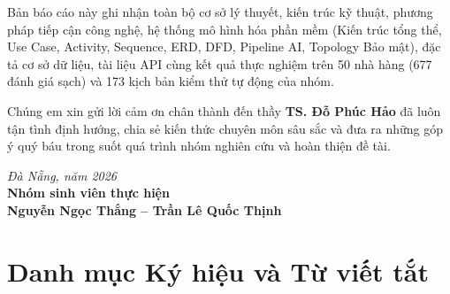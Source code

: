 \documentclass[12pt, a4paper]{article}
\begin{document}
Bản báo cáo này ghi nhận toàn bộ cơ sở lý thuyết, kiến trúc kỹ thuật, phương pháp tiếp cận công nghệ, hệ thống mô hình hóa phần mềm (Kiến trúc tổng thể, Use Case, Activity, Sequence, ERD, DFD, Pipeline AI, Topology Bảo mật), đặc tả cơ sở dữ liệu, tài liệu API cùng kết quả thực nghiệm trên 50 nhà hàng (677 đánh giá sạch) và 173 kịch bản kiểm thử tự động của nhóm.

Chúng em xin gửi lời cảm ơn chân thành đến thầy \textbf{TS. Đỗ Phúc Hảo} đã luôn tận tình định hướng, chia sẻ kiến thức chuyên môn sâu sắc và đưa ra những góp ý quý báu trong suốt quá trình nhóm nghiên cứu và hoàn thiện đề tài.

\vspace{1.2cm}
\begin{flushright}
\textit{Đà Nẵng, năm 2026}\\
\textbf{Nhóm sinh viên thực hiện}\\[1.0cm]
\textbf{Nguyễn Ngọc Thắng -- Trần Lê Quốc Thịnh}
\end{flushright}

\newpage
\tableofcontents

\newpage
\listoftables
{}
\vspace{0.8cm}
\listoffigures
{}

\newpage
\section*{Danh mục Ký hiệu và Từ viết tắt}
\end{document}
